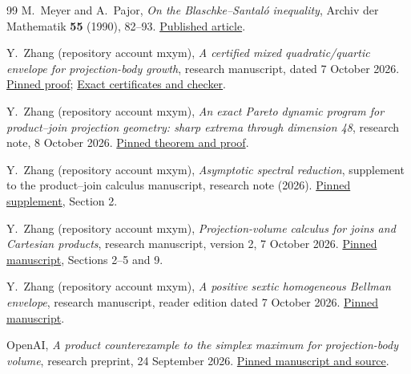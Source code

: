 \documentclass[11pt]{article}
\begin{document}
\begin{thebibliography}{99}
M.~Meyer and A.~Pajor, \emph{On the Blaschke--Santal\'o inequality},
Archiv der Mathematik \textbf{55} (1990), 82--93.
\href{https://doi.org/10.1007/BF01199119}{Published article}.

Y.~Zhang (repository account mxym), \emph{A certified mixed quadratic/quartic
envelope for projection-body growth}, research manuscript, dated
7 October 2026.
\href{https://github.com/mxym/math/blob/2fc3f25179cf1128c4bccbde65fd3a07c093ad6d/notes/mixed-bellman-product-join/proof.md}{Pinned proof};
\href{https://github.com/mxym/math/tree/2fc3f25179cf1128c4bccbde65fd3a07c093ad6d/notes/mixed-bellman-product-join}{Exact certificates and checker}.

Y.~Zhang (repository account mxym), \emph{An exact Pareto dynamic program for
product--join projection geometry: sharp extrema through dimension 48},
research note, 8 October 2026.
\href{https://github.com/mxym/math/blob/55ba5a7be927e3e7d2dbfd8d054db91b63d8d755/notes/exact-product-join-finite-optima/paper.md}{Pinned theorem and proof}.

Y.~Zhang (repository account mxym), \emph{Asymptotic spectral reduction}, supplement
to the product--join calculus manuscript, research note (2026).
\href{https://github.com/mxym/math/blob/2fc3f25179cf1128c4bccbde65fd3a07c093ad6d/preprints/005-simplex-product-optimum/v2/ASYMPTOTIC_SPECTRAL_REDUCTION.md}{Pinned supplement}, Section 2.

Y.~Zhang (repository account mxym), \emph{Projection-volume calculus for joins and
Cartesian products}, research manuscript, version 2, 7 October 2026.
\href{https://github.com/mxym/math/blob/2fc3f25179cf1128c4bccbde65fd3a07c093ad6d/preprints/005-simplex-product-optimum/v2/paper.md}{Pinned manuscript}, Sections 2--5 and 9.

Y.~Zhang (repository account mxym), \emph{A positive sextic homogeneous
Bellman envelope}, research manuscript, reader edition dated 7 October 2026.
\href{https://github.com/mxym/math/blob/4248c2b2d4cad94d4269def3158b414352e1a40b/notes/mixed-bellman-product-join/positive-sextic/proof.md}{Pinned manuscript}.

OpenAI, \emph{A product counterexample to the simplex maximum for
projection-body volume}, research preprint, 24 September 2026.
\href{https://github.com/openai/math/tree/fd4aeeb2ee4fc729c18d98444fed42fd0529eeeb/preprints/A-product-counterexample-to-the-simplex-maximum-for-projection-body-volume-September-24-2026}{Pinned manuscript and source}.


\end{thebibliography}
\end{document}

